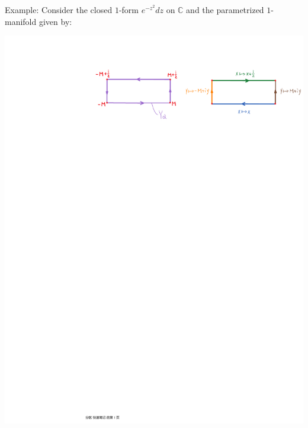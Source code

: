 \documentclass[11pt,oneside]{book}
\theoremstyle{break}
\theoremstyle{break}
\newcommand{\Complex}{\mathbb{C}}
\newcommand{\example}{\color{green}Example: \color{black}}
\begin{document}
\example Consider the closed $1$-form $e^{-z^2} dz$ on $\Complex$ and the parametrized $1$-manifold given by:\\
\begin{center}
\includegraphics[scale=0.9]{paths.pdf}
\end{center}
\end{document}
